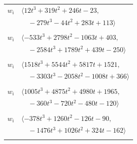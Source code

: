 \documentclass[11pt]{article}
\begin{document}
\begin{longtable}{@{}ll@{}}
$w_i$ & $\langle 12t^{3}+319t^{2}+246t-23,$\\
 & $\quad -279t^{3}-44t^{2}+283t+113\rangle$\\
\addlinespace[2pt]
\multicolumn{2}{@{}p{0.97\textwidth}@{}}{$i=24$, $D_i=8$, $\rho_{ij}$: $0{:}1, \allowbreak 1{:}1, \allowbreak 2{:}2, \allowbreak 10{:}1, \allowbreak 11{:}1, \allowbreak 14{:}1, \allowbreak 16{:}2, \allowbreak 28{:}2, \allowbreak 35{:}2, \allowbreak 38{:}2, \allowbreak 40{:}1, \allowbreak 42{:}2, \allowbreak 44{:}1, \allowbreak 48{:}2, \allowbreak 52{:}2$}\\
$w_i$ & $\langle -533t^{3}+2798t^{2}-1063t+403,$\\
 & $\quad -2584t^{3}+1789t^{2}+439t-250\rangle$\\
\addlinespace[2pt]
\multicolumn{2}{@{}p{0.97\textwidth}@{}}{$i=25$, $D_i=16$, $\rho_{ij}$: $7{:}2, \allowbreak 16{:}1, \allowbreak 21{:}2, \allowbreak 23{:}2, \allowbreak 26{:}1, \allowbreak 27{:}2, \allowbreak 28{:}2, \allowbreak 30{:}1, \allowbreak 35{:}1, \allowbreak 38{:}1, \allowbreak 42{:}1, \allowbreak 44{:}1, \allowbreak 49{:}1, \allowbreak 57{:}2$}\\
$w_i$ & $\langle 1518t^{3}+5544t^{2}+5817t+1521,$\\
 & $\quad -3303t^{3}-2058t^{2}-1008t+366\rangle$\\
\addlinespace[2pt]
\multicolumn{2}{@{}p{0.97\textwidth}@{}}{$i=26$, $D_i=8$, $\rho_{ij}$: $3{:}1, \allowbreak 5{:}1, \allowbreak 14{:}2, \allowbreak 22{:}2, \allowbreak 23{:}2, \allowbreak 25{:}2, \allowbreak 27{:}1, \allowbreak 46{:}1, \allowbreak 49{:}2, \allowbreak 50{:}1, \allowbreak 56{:}1$}\\
$w_i$ & $\langle 1005t^{3}+4875t^{2}+4980t+1965,$\\
 & $\quad -360t^{3}-720t^{2}-480t-120\rangle$\\
\addlinespace[2pt]
\multicolumn{2}{@{}p{0.97\textwidth}@{}}{$i=27$, $D_i=8$, $\rho_{ij}$: $4{:}1, \allowbreak 5{:}2, \allowbreak 6{:}1, \allowbreak 14{:}1, \allowbreak 17{:}2, \allowbreak 18{:}2, \allowbreak 20{:}1, \allowbreak 25{:}1, \allowbreak 26{:}2, \allowbreak 28{:}2, \allowbreak 37{:}2, \allowbreak 41{:}1, \allowbreak 43{:}2, \allowbreak 52{:}1, \allowbreak 54{:}1, \allowbreak 55{:}2$}\\
$w_i$ & $\langle -378t^{3}+1260t^{2}-126t-90,$\\
 & $\quad -1476t^{3}+1026t^{2}+324t-162\rangle$\\
\addlinespace[2pt]
\multicolumn{2}{@{}p{0.97\textwidth}@{}}{$i=28$, $D_i=64$, $\rho_{ij}$: $15{:}1, \allowbreak 17{:}2, \allowbreak 19{:}1, \allowbreak 24{:}1, \allowbreak 25{:}1, \allowbreak 27{:}1, \allowbreak 35{:}2, \allowbreak 37{:}1, \allowbreak 38{:}1, \allowbreak 40{:}1, \allowbreak 41{:}1, \allowbreak 46{:}1, \allowbreak 48{:}2, \allowbreak 49{:}1, \allowbreak 50{:}1, \allowbreak 51{:}2, \allowbreak 58{:}2$}\\

\end{longtable}
\end{document}
